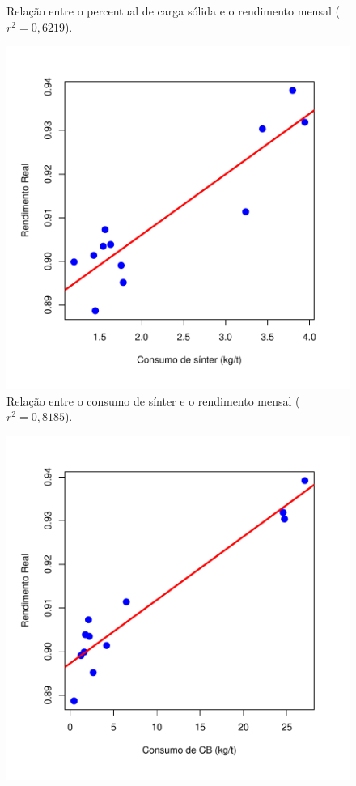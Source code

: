 \begin{multicols}{2}
\begin{figure}[H]
		\caption{Relação entre o percentual de carga sólida e o rendimento mensal ($r^2=0,6219$).}
		\label{fig:psuc}
	\end{figure}			
	\begin{figure}[H]
		\centering
		\includegraphics[scale=0.4, bb=0 0 432 432, trim=0in 0in 0in 107pt]{figures/fig04.pdf} %
		\caption{Relação entre o consumo de sínter e o rendimento mensal ($r^2=0,8185$).}
		\label{fig:psint}
	\end{figure}
	\begin{figure}[H]
		\centering
		\includegraphics[scale=0.4, bb=0 0 432 432, trim=0in 0in 0in 0pt]{figures/fig05.pdf} %

\end{figure}
\end{multicols}
